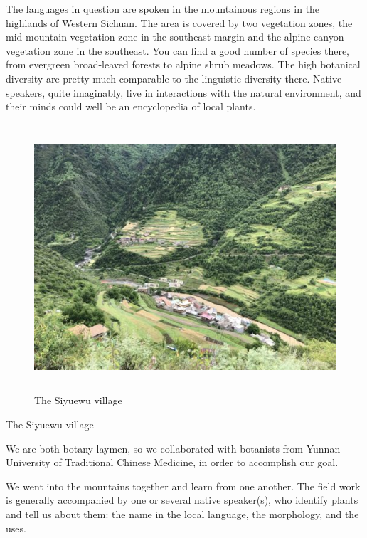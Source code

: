 \documentclass[
  a4paper,
  14pt,
  oneside,
  tablecaptionabove
]{scrbook}
\begin{document}
The languages in question are spoken in the mountainous regions in the
highlands of Western Sichuan. The area is covered by two vegetation
zones, the mid-mountain vegetation zone in the southeast margin and the
alpine canyon vegetation zone in the southeast. You can find a good
number of species there, from evergreen broad-leaved forests to alpine
shrub meadows. The high botanical diversity are pretty much comparable
to the linguistic diversity there. Native speakers, quite imaginably,
live in interactions with the natural environment, and their minds could
well be an encyclopedia of local plants.

\leavevmode\hypertarget{attachment_2143}{}%
\begin{figure}
\centering
\includegraphics[width=5.20833in,height=3.90625in]{images/IMG_7199-500x375.jpg}
\caption{The Siyuewu village}
\end{figure}

The Siyuewu village

We are both botany laymen, so we collaborated with botanists from Yunnan
University of Traditional Chinese Medicine, in order to accomplish our
goal.

We went into the mountains together and learn from one another. The
field work is generally accompanied by one or several native speaker(s),
who identify plants and tell us about them: the name in the local
language, the morphology, and the uses.
\end{document}
